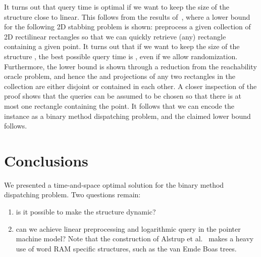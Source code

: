\documentclass[runningheads]{llncs}
\begin{document}
It turns out that  query time is optimal if we want to keep the size of the structure close to linear. This follows from the results of~\cite{Patrascu}, where a lower bound for the following 2D stabbing problem is shown: preprocess a given collection of  2D rectilinear rectangles so that we can quickly retrieve (any) rectangle containing a given point. It turns out that if we want to keep the size of the structure , the best possible query time is , even if we allow randomization. Furthermore, the lower bound is shown through a reduction from the reachability oracle problem, and hence the  and  projections of any two rectangles in the collection are either disjoint or contained in each other. A closer inspection of the proof shows that the queries can be assumed to be chosen so that there is at most one rectangle containing the point. It follows that we can encode the instance as a binary method dispatching problem, and the claimed lower bound follows.

\section{Conclusions}

We presented a time-and-space optimal solution for the binary method dispatching problem. Two questions remain:

\begin{enumerate}
\item is it possible to make the structure dynamic?
\item can we achieve linear preprocessing and logarithmic query in the pointer machine model? Note that the construction of Alstrup et al.~\cite{Alstrup} makes a heavy use of word RAM specific structures, such as the van Emde Boas trees.
\end{enumerate}



\end{document}
